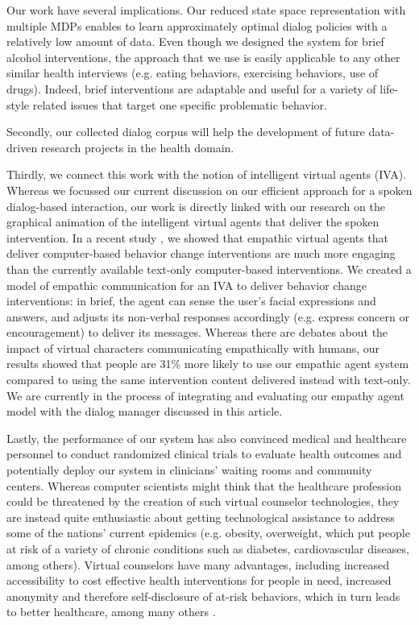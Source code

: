 \begin{sloppy}
Our work have several implications.  Our reduced state space representation with multiple MDPs enables to learn approximately optimal dialog policies with a relatively low amount of data. Even though we designed the system for brief alcohol interventions, the approach that we use is easily applicable to any other similar health interviews (e.g. eating behaviors, exercising behaviors, use of drugs). Indeed, brief interventions are adaptable and useful for a variety of life-style related issues that target one specific problematic behavior. 

Secondly, our collected dialog corpus will help the development of future data-driven research projects in the health domain.  

Thirdly, we connect this work with the notion of intelligent virtual agents (IVA).  Whereas we focussed our current discussion on our efficient approach for a spoken dialog-based interaction, our work is directly linked with our research on the graphical animation of the intelligent virtual agents that deliver the spoken intervention.  In a recent study  \cite{lisetti2013}, we showed that empathic virtual agents that deliver computer-based behavior change interventions are much more engaging than the currently available text-only computer-based interventions.  We created a model of empathic communication for an IVA to deliver behavior change interventions: in brief, the agent can sense the user's facial expressions and answers, and adjusts its non-verbal responses accordingly (e.g. express concern or encouragement) to deliver its messages.  Whereas there are debates about the impact of virtual characters communicating empathically with humans, our results showed that people are 31\% more likely to use our empathic agent system compared to using the same intervention content delivered instead with text-only.  We are currently in the process of integrating and evaluating our empathy agent model with the dialog manager discussed in this article.

Lastly, the performance of our system has also convinced medical and healthcare personnel to conduct randomized clinical trials to evaluate health outcomes and potentially deploy our system in clinicians' waiting rooms and community centers.  Whereas computer scientists might think that the healthcare profession could be threatened by the creation of such virtual counselor technologies, they are instead quite enthusiastic about getting technological assistance to address some of the nations' current epidemics (e.g. obesity, overweight, which put people at risk of a variety of chronic conditions such as diabetes, cardiovascular diseases, among others).  Virtual counselors have many advantages, including  increased accessibility to cost effective health interventions for people in need, increased anonymity and therefore self-disclosure of at-risk behaviors, which in turn leads to better healthcare, among many others \cite{lisetti2013}.


\end{sloppy}
